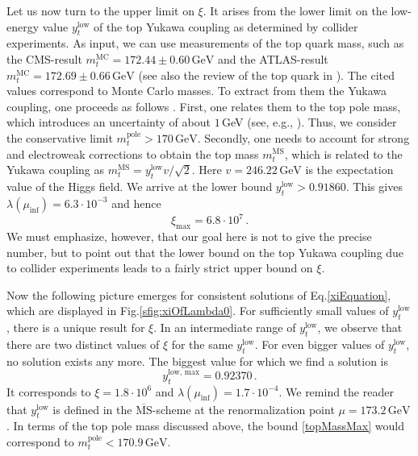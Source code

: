 \documentclass[a4paper,11pt]{article}
\makeatletter
\newcommand*{\eg}{e.g., }
\newcommand*{\fig}{Fig.\@\xspace}
\newcommand*{\Eq}{Eq.\@\xspace}
\makeatother
\begin{document}
Let us now turn to the upper limit on $\xi$. It arises from the lower limit on the low-energy value $y_{t}^{\text{low}}$ of the top Yukawa coupling as determined by collider experiments. As input, we can use measurements of the top quark mass, such as the CMS-result \cite{1509.04044} $m_{t}^{\text{MC}} = 172.44\pm 0.60 \, \text{GeV}$ and the ATLAS-result \cite{1810.01772}  $m_{t}^{\text{MC}} = 172.69\pm 0.66 \, \text{GeV}$ (see also the review of the top quark in \cite{Tanabashi:2018oca}). The cited values correspond to Monte Carlo masses. To extract from them the Yukawa coupling, one proceeds as follows \cite{1411.1923}. First, one relates them to the top pole mass, which introduces an uncertainty of about $1\,$GeV (see, \eg \cite{1412.3649, 1801.03944}).  Thus, we consider the conservative limit $m_{t}^{\text{pole}} > 170\,\text{GeV}$. Secondly, one needs to account for strong and electroweak corrections to obtain the top mass $m_t^{\overline{\text{MS}}}$, which is related to the Yukawa coupling as $m_t^{\overline{\text{MS}}}=y_t^{\text{low}}v/\sqrt{2}$. Here $v=246.22\,\text{GeV}$ is the expectation value of the Higgs field. We arrive at the lower bound $y_t^{\text{low}}>0.91860$.
This gives $\lambda(\mu_{\text{inf}}) = 6.3\cdot 10^{-3}$ and hence
\begin{equation} \label{upperXi}
\xi_{\text{max}} = 6.8 \cdot 10^{7} \,.
\end{equation}
We must emphasize, however, that our goal here is not to give the precise number, but to point out that the lower bound on the top Yukawa coupling due to collider experiments leads to a fairly strict upper bound on $\xi$.

Now the following picture emerges for consistent solutions of \Eq \eqref{xiEquation}, which are displayed in \fig \ref{sfig:xiOfLambda0}. For sufficiently small values of $y_t^{\text{low}}$, there is a unique result for $\xi$. In an intermediate range of $y_t^{\text{low}}$, we observe that there are two distinct values of $\xi$ for the same $y_t^{\text{low}}$. For even bigger values of $y_t^{\text{low}}$, no solution exists any more. The biggest value for which we find a solution is 
\begin{equation} \label{topMassMax}
y_t^{\text{low, max}} = 0.92370 \,.
\end{equation}
It corresponds to $\xi = 1.8 \cdot 10^6$ and $\lambda(\mu_{\text{inf}}) = 1.7 \cdot 10^{-4}$. We remind the reader that $y_t^{\text{low}}$ is defined in the $\overline{\text{MS}}$-scheme at the renormalization point $\mu=173.2\,\text{GeV}$. In terms of the top pole mass discussed above, the bound \eqref{topMassMax} would correspond to $m_t^{\text{pole}}<170.9\,\text{GeV}$.
\end{document}
